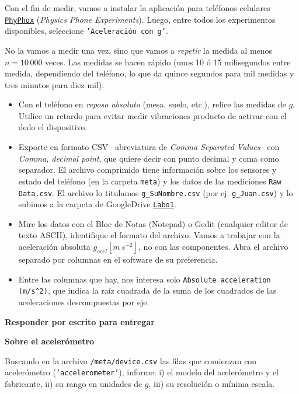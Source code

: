 \documentclass[10pt,a4paper]{article}
\numberwithin{equation}{section}%
\numberwithin{equation}{subsection}
\begin{document}
Con el fin de medir, vamos a instalar la aplicación para teléfonos celulares \href{https://play.google.com/store/apps/details?id=de.rwth_aachen.phyphox&hl=es_CO}{\texttt{PhyPhox}} (\textit{Physics Phone Experiments}). Luego, entre todos los experimentos disponibles, seleccione \texttt{'Aceleración con g'}.
 
No la vamos a medir una vez, sino que vamos a \textit{repetir} la medida al menos $n = 10\, 000$ veces. Las medidas se hacen rápido (unos 10 ó 15 milisegundos entre medida, dependiendo del teléfono, lo que da quince segundos para mil medidas y tres minutos para diez mil). 


\begin{itemize}
\item[$\bullet$] Con el teléfono en \textit{reposo absoluto} (mesa, suelo, etc.), relice las medidas de $g$. Utilice un retardo para evitar medir vibraciones producto de activar con el dedo el dispositivo. 
\item[$\bullet$] Exporte en formato CSV --abreviatura de \textit{Comma Separated Values}-- con \textit{Comma, decimal point}, que quiere decir con punto decimal y coma como separador. El archivo comprimido tiene información sobre los sensores y estado del teléfono (en la carpeta \texttt{meta}) y los datos de las mediciones \texttt{Raw Data.csv}. El archivo lo titulamos \texttt{g\_SuNombre.csv} (por ej. \texttt{g\_Juan.csv}) y lo subimos a la carpeta de GoogleDrive \href{https://drive.google.com/drive/folders/1LymeojuA8o-yXZXTr15Gm89PsJ5JTVWf?usp=sharing}{\texttt{Labo1}}.
\item[$\bullet$] Mire los datos con el Bloc de Notas (Notepad) o Gedit (cualquier editor de texto ASCII), identifique el formato del archivo. Vamos a trabajar con la aceleración absoluta $g _{acel}[m\, s^{-2}]$, no con las componentes. Abra el archivo separado por columnas en el software de su preferencia. 
\item[$\bullet$]  Entre las columnas que hay, nos interesa solo \texttt{Absolute acceleration (m/s\^{}2)}, que indica la raíz cuadrada de la suma de los cuadrados de las aceleraciones descompuestas por eje.



\end{itemize}



\textbf{Responder por escrito para entregar}

\textbf{Sobre el acelerómetro}

Buscando en la archivo \texttt{/meta/device.csv} las filas que comienzan con acelerómetro (\texttt{'accelerometer'}), informe: i) el modelo del acelerómetro y el fabricante, ii) su rango en unidades de $g$, iii) su resolución o mínima escala. 
\end{document}
